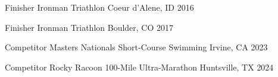 



\begin{cvhonors}


\cvhonor
{Finisher} %
{Ironman Triathlon} %
{Coeur d'Alene, ID} %
{2016} %


\cvhonor
{Finisher} %
{Ironman Triathlon} %
{Boulder, CO} %
{2017} %


\cvhonor
{Competitor} %
{Masters Nationals Short-Course Swimming} %
{Irvine, CA} %
{2023} %


\cvhonor
{Competitor} %
{Rocky Racoon 100-Mile Ultra-Marathon} %
{Huntsville, TX} %
{2024} %


\end{cvhonors}